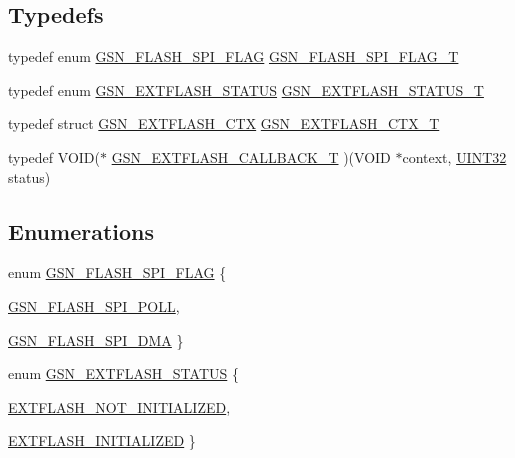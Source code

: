 \subsection*{Typedefs}
\begin{DoxyCompactItemize}
\item 
typedef enum \hyperlink{a00496_a78eb37149520ca722a842d9d7634d842}{GSN\_\-FLASH\_\-SPI\_\-FLAG} \hyperlink{a00496_ae69f658e2fd080c54a78eb23e4be2f59}{GSN\_\-FLASH\_\-SPI\_\-FLAG\_\-T}
\item 
typedef enum \hyperlink{a00496_aa52f9dfb770e5b9fb72da1dce229b396}{GSN\_\-EXTFLASH\_\-STATUS} \hyperlink{a00496_a880714aa4bccea65a8e3d427e9e395da}{GSN\_\-EXTFLASH\_\-STATUS\_\-T}
\item 
typedef struct \hyperlink{a00071}{GSN\_\-EXTFLASH\_\-CTX} \hyperlink{a00496_a200382e5889d0c036a3205e38b2666cb}{GSN\_\-EXTFLASH\_\-CTX\_\-T}
\item 
typedef VOID($\ast$ \hyperlink{a00496_a501e29be4c0f8b2ab5c186eb8deb8874}{GSN\_\-EXTFLASH\_\-CALLBACK\_\-T} )(VOID $\ast$context, \hyperlink{a00660_gae1e6edbbc26d6fbc71a90190d0266018}{UINT32} status)
\end{DoxyCompactItemize}
\subsection*{Enumerations}
\begin{DoxyCompactItemize}
\item 
enum \hyperlink{a00496_a78eb37149520ca722a842d9d7634d842}{GSN\_\-FLASH\_\-SPI\_\-FLAG} \{ \par
\hyperlink{a00496_a78eb37149520ca722a842d9d7634d842a55c00985e020036d0fc78c8fdf55da43}{GSN\_\-FLASH\_\-SPI\_\-POLL}, 
\par
\hyperlink{a00496_a78eb37149520ca722a842d9d7634d842a755b8879e5d40e0556e722180ba309f2}{GSN\_\-FLASH\_\-SPI\_\-DMA}
 \}
\item 
enum \hyperlink{a00496_aa52f9dfb770e5b9fb72da1dce229b396}{GSN\_\-EXTFLASH\_\-STATUS} \{ \par
\hyperlink{a00496_aa52f9dfb770e5b9fb72da1dce229b396a1bf08415ebd0b6f202a5098833461689}{EXTFLASH\_\-NOT\_\-INITIALIZED}, 
\par
\hyperlink{a00496_aa52f9dfb770e5b9fb72da1dce229b396a22366d2634a3ce193da3d2707e4b772b}{EXTFLASH\_\-INITIALIZED}
 \}
\end{DoxyCompactItemize}
